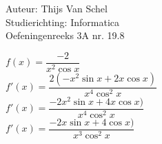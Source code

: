 \documentclass[a4paper]{article}
\begin{document}
  
\noindent \large Auteur: Thijs Van Schel \\
\noindent \large Studierichting: Informatica\\
\noindent \large Oefeningenreeks 3A nr. 19.8\\

\medskip

\normalsize

$f(x) = \dfrac{-2}{x^2\cos{x}}$ \\

$f'(x) = \dfrac{2(-x^2\sin{x}+2x\cos{x})}{x^4\cos^2{x}}$ \\

$f'(x) = \dfrac{-2x^2\sin{x}+4x\cos{x})}{x^4\cos^2{x}}$ \\

$f'(x) = \dfrac{-2x\sin{x}+4\cos{x})}{x^3\cos^2{x}}$

\begin{thebibliography}{999}
\end{thebibliography}
\end{document}
